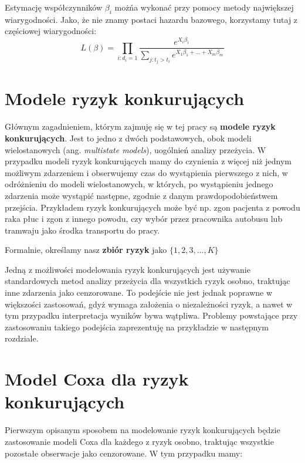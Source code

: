 \documentclass[]{pracamgr}
\begin{document}
Estymację współczynników $\beta_i$ możńa wykonać przy pomocy metody największej wiarygodności. Jako, że nie znamy postaci hazardu bazowego, korzystamy tutaj z częściowej wiarygodności:
\begin{equation}
L(\beta) = \prod_{i: d_{i} = 1} \frac{e^{X_{i}\beta_{i}}}{\sum_{j:t_{j}>t_{i}}e^{X_{1}\beta_{1}+...+X_{m}\beta_{m}}}
\end{equation}









\section{Modele ryzyk konkurujących}\label{comp risks}

Głównym zagadnieniem, którym zajmuję się w tej pracy są \textbf{modele ryzyk konkurujących}. Jest to jedno z dwóch podstawowych, obok modeli wielostanowych (ang. \textit{multistate models}), uogólnień analizy przeżycia. W przypadku modeli ryzyk konkurujących mamy do czynienia z więcej niż jednym możliwym zdarzeniem i obserwujemy czas do wystąpienia pierwszego z nich, w odróżnieniu do modeli wielostanowych, w których, po wystąpieniu jednego zdarzenia może wystąpić następne, zgodnie z danym prawdopodobieństwem przejścia. Przykładem ryzyk konkurujących może być np. zgon pacjenta z powodu raka płuc i zgon z innego powodu, czy wybór przez pracownika autobusu lub tramwaju jako środka transportu do pracy.

Formalnie, określamy nasz \textbf{zbiór ryzyk} jako $\{1,2,3,...,K\}$

Jedną z możliwości modelowania ryzyk konkurujących jest używanie standardowych metod analizy przeżycia dla wszystkich ryzyk osobno, traktując inne zdarzenia jako cenzorowane. To podejście nie jest jednak poprawne w większości zastosowań, gdyż wymaga założenia o niezależności ryzyk, a nawet w tym przypadku interpretacja wyników bywa wątpliwa. Problemy powstające przy zastosowaniu takiego podejścia zaprezentuję na przykładzie w następnym rozdziale.

\section{Model Coxa dla ryzyk konkurujących}

Pierwszym opisanym sposobem na modelowanie ryzyk konkurujących będzie zastosowanie modeli Coxa dla każdego z ryzyk osobno, traktując wszystkie pozostałe obserwacje jako cenzorowane. W tym przypadku mamy:
\end{document}
